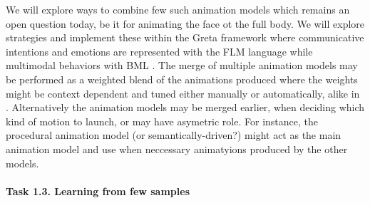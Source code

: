 We will explore ways to combine few such animation models which remains an open question today, be it for animating the face ot the full body. We will explore strategies and implement these within the Greta framework where communicative intentions and emotions are represented with the FLM language while multimodal behaviors with BML \cite{DBLP:conf/iva/VilhjalmssonCCCKKMMMPRTWW07}. The merge of multiple animation models may be performed as a weighted blend of the animations produced where the weights might be context dependent and tuned either manually or automatically, alike in \cite{DBLP:journals/tvcg/ShoulsonMKB14}. Alternatively the animation models may be merged earlier, when deciding which kind of motion to launch, or may have asymetric role. For instance, the procedural animation model (or semantically-driven?) might act as the main animation model and use when neccessary animatyions produced by the other models.




% 
% 

\paragraph{Task 1.3. Learning from few samples}


